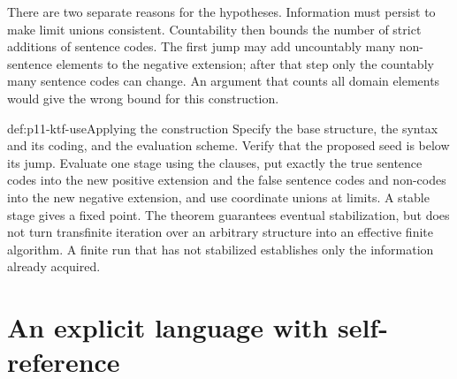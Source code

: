 There are two separate reasons for the hypotheses. Information must persist
to make limit unions consistent. Countability then bounds the number of
strict additions of sentence codes. The first jump may add uncountably many
non-sentence elements to the negative extension; after that step only the
countably many sentence codes can change. An argument that counts all
domain elements would give the wrong bound for this construction.

\begin{hbmethod}{def:p11-ktf-use}{Applying the construction}
Specify the base structure, the syntax and its coding, and the evaluation
scheme. Verify that the proposed seed is below its jump. Evaluate one stage
using the clauses, put exactly the true sentence codes into the new positive
extension and the false sentence codes and non-codes into the new negative
extension, and use coordinate unions at limits. A stable stage gives a
fixed point. The theorem guarantees eventual stabilization, but does not
turn transfinite iteration over an arbitrary structure into an effective
finite algorithm. A finite run that has not stabilized establishes only
the information already acquired.
\end{hbmethod}

\section{An explicit language with self-reference}

